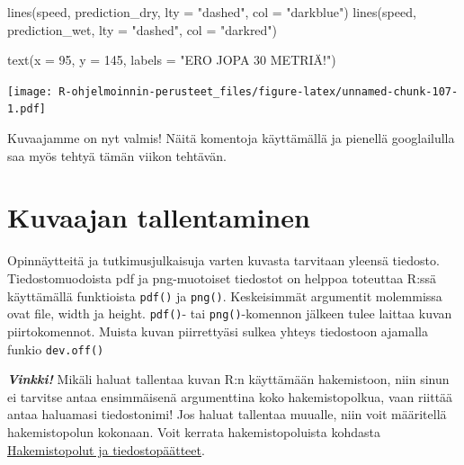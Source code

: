 \documentclass[
]{book}
\newenvironment{Shaded}{\begin{snugshade}}{\end{snugshade}}
\newcommand{\AttributeTok}[1]{\textcolor[rgb]{0.77,0.63,0.00}{#1}}
\newcommand{\DecValTok}[1]{\textcolor[rgb]{0.00,0.00,0.81}{#1}}
\newcommand{\FunctionTok}[1]{\textcolor[rgb]{0.00,0.00,0.00}{#1}}
\newcommand{\NormalTok}[1]{#1}
\newcommand{\StringTok}[1]{\textcolor[rgb]{0.31,0.60,0.02}{#1}}
\begin{document}
\begin{Shaded}
\begin{Highlighting}[]
\FunctionTok{lines}\NormalTok{(speed, prediction\_dry, }\AttributeTok{lty =} \StringTok{"dashed"}\NormalTok{, }\AttributeTok{col =} \StringTok{"darkblue"}\NormalTok{)}
\FunctionTok{lines}\NormalTok{(speed, prediction\_wet, }\AttributeTok{lty =} \StringTok{"dashed"}\NormalTok{, }\AttributeTok{col =} \StringTok{"darkred"}\NormalTok{)}

\FunctionTok{text}\NormalTok{(}\AttributeTok{x =} \DecValTok{95}\NormalTok{, }\AttributeTok{y =} \DecValTok{145}\NormalTok{, }\AttributeTok{labels =} \StringTok{"ERO JOPA 30 METRIÄ!"}\NormalTok{) }
\end{Highlighting}
\end{Shaded}

\texttt{[image: R-ohjelmoinnin-perusteet\_files/figure-latex/unnamed-chunk-107-1.pdf]}

Kuvaajamme on nyt valmis! Näitä komentoja käyttämällä ja pienellä googlailulla saa myös tehtyä tämän viikon tehtävän.

\hypertarget{kuvaajan-tallentaminen}{%
\section{Kuvaajan tallentaminen}\label{kuvaajan-tallentaminen}}

Opinnäytteitä ja tutkimusjulkaisuja varten kuvasta tarvitaan yleensä tiedosto. Tiedostomuodoista pdf ja png-muotoiset tiedostot on helppoa toteuttaa R:ssä käyttämällä funktioista \texttt{pdf()} ja \texttt{png()}. Keskeisimmät argumentit molemmissa ovat file, width ja height. \texttt{pdf()}- tai \texttt{png()}-komennon jälkeen tulee laittaa kuvan piirtokomennot. Muista kuvan piirrettyäsi sulkea yhteys tiedostoon ajamalla funkio \texttt{dev.off()}

\textbf{\emph{Vinkki!}} Mikäli haluat tallentaa kuvan R:n käyttämään hakemistoon, niin sinun ei tarvitse antaa ensimmäisenä argumenttina koko hakemistopolkua, vaan riittää antaa haluamasi tiedostonimi! Jos haluat tallentaa muualle, niin voit määritellä hakemistopolun kokonaan. Voit kerrata hakemistopoluista kohdasta \protect\hyperlink{hakemistopolut-ja-tiedostopuxe4uxe4tteet}{Hakemistopolut ja tiedostopäätteet}.
\end{document}
